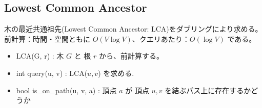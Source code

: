 \subsection{Lowest Common Ancestor}

木の最近共通祖先(Lowest Common Ancestor: LCA)をダブリングにより求める。前計算：時間・空間ともに $O(V \log V)$、クエリあたり：$O(\log V)$ である。
\begin{itemize}
    \item LCA(G, r) : 木 $G$ と 根 $r$ から、前計算する。
    \item int query(u, v) : LCA($u,v$) を求める.
    \item bool is\_on\_path(u, v, a) : 頂点 $a$ が 頂点 $u, v$ を結ぶパス上に存在するかどうか
\end{itemize}



